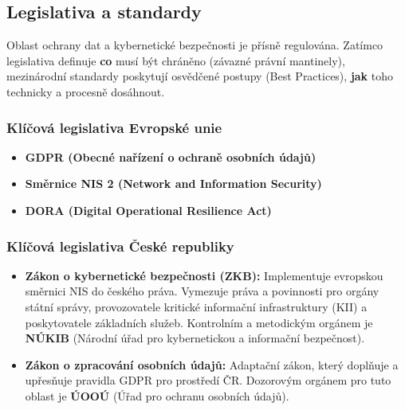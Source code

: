 \subsection{Legislativa a standardy}

Oblast ochrany dat a kybernetické bezpečnosti je přísně regulována. Zatímco legislativa definuje \textbf{co} musí být chráněno (závazné právní mantinely), mezinárodní standardy poskytují osvědčené postupy (Best Practices), \textbf{jak} toho technicky a procesně dosáhnout.

\subsubsection*{Klíčová legislativa Evropské unie}
\begin{itemize}
    \item \textbf{GDPR (Obecné nařízení o ochraně osobních údajů)} 
    \item \textbf{Směrnice NIS 2 (Network and Information Security)}
    \item \textbf{DORA (Digital Operational Resilience Act)}
\end{itemize}
\subsubsection*{Klíčová legislativa České republiky}
\begin{itemize}
    \item \textbf{Zákon o kybernetické bezpečnosti (ZKB):} Implementuje evropskou směrnici NIS do českého práva. Vymezuje práva a povinnosti pro orgány státní správy, provozovatele kritické informační infrastruktury (KII) a poskytovatele základních služeb. Kontrolním a metodickým orgánem je \textbf{NÚKIB} (Národní úřad pro kybernetickou a informační bezpečnost).
    \item \textbf{Zákon o zpracování osobních údajů:} Adaptační zákon, který doplňuje a upřesňuje pravidla GDPR pro prostředí ČR. Dozorovým orgánem pro tuto oblast je \textbf{ÚOOÚ} (Úřad pro ochranu osobních údajů).
\end{itemize}

